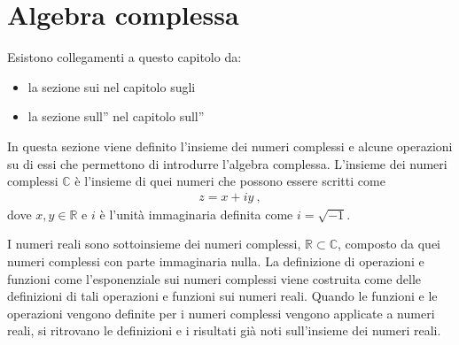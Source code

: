 \documentclass[letterpaper,10pt,italian]{jupyterBook}
\begin{document}
\chapter{Algebra complessa}
\label{\detokenize{ch/algebra/complex-algebra:algebra-complessa}}\label{\detokenize{ch/algebra/complex-algebra:math-hs-algebra-complex}}\label{\detokenize{ch/algebra/complex-algebra::doc}}
\sphinxAtStartPar
Esistono collegamenti a questo capitolo da:
\begin{itemize}
\item {} 
\sphinxAtStartPar
la sezione sui {\hyperref[\detokenize{ch/set/numeric-sets:sets-numeric-c}]{}} nel capitolo sugli {\hyperref[\detokenize{ch/set/numeric-sets:sets-numeric}]{}}

\item {} 
\sphinxAtStartPar
la sezione sull”{\hyperref[\detokenize{ch/algebra/complex-algebra-link:math-hs-algebra-complex-link}]{}} nel capitolo sull”{\hyperref[\detokenize{ch/algebra:math-hs-algebra}]{}}

\end{itemize}

\sphinxAtStartPar
In questa sezione viene definito l’insieme dei numeri complessi e alcune operazioni su di essi che permettono di introdurre l’algebra complessa. L’insieme dei numeri complessi \(\mathbb{C}\) è l’insieme di quei numeri che possono essere scritti come
\begin{equation*}
\begin{split}z = x + i y \ ,\end{split}
\end{equation*}
\sphinxAtStartPar
dove \(x, y \in \mathbb{R}\) e \(i\) è l’unità immaginaria definita come \(i = \sqrt{-1}\).

\sphinxAtStartPar
I numeri reali sono sottoinsieme dei numeri complessi, \(\mathbb{R} \subset \mathbb{C}\), composto da quei numeri complessi con parte immaginaria nulla. La definizione di operazioni e funzioni \sphinxhyphen{} come l’esponenziale \sphinxhyphen{} sui numeri complessi viene costruita come  delle definizioni di tali operazioni e funzioni sui numeri reali. Quando le funzioni e le operazioni vengono definite per i numeri complessi vengono applicate a numeri reali, si ritrovano le definizioni e i risultati già noti sull’insieme dei numeri reali.
\end{document}
